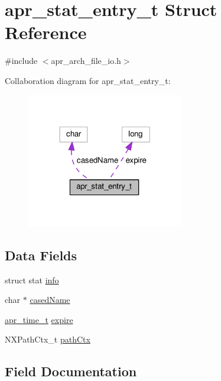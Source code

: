 \hypertarget{structapr__stat__entry__t}{}\section{apr\+\_\+stat\+\_\+entry\+\_\+t Struct Reference}
\label{structapr__stat__entry__t}


{\ttfamily \#include $<$apr\+\_\+arch\+\_\+file\+\_\+io.\+h$>$}



Collaboration diagram for apr\+\_\+stat\+\_\+entry\+\_\+t\+:
\nopagebreak
\begin{figure}[H]
\begin{center}
\leavevmode
\includegraphics[width=194pt]{structapr__stat__entry__t__coll__graph}
\end{center}
\end{figure}
\subsection*{Data Fields}
\begin{DoxyCompactItemize}
\item 
struct stat \hyperlink{structapr__stat__entry__t_aee1501fc3891a4e65d4c8b6130bb928a}{info}
\item 
char $\ast$ \hyperlink{structapr__stat__entry__t_a7b317c0cbf1cda51d11bd7d75cc3f7d9}{cased\+Name}
\item 
\hyperlink{group__apr__time_gadb4bde16055748190eae190c55aa02bb}{apr\+\_\+time\+\_\+t} \hyperlink{structapr__stat__entry__t_a8d69f4898156e3ff0e79b61ea7370277}{expire}
\item 
N\+X\+Path\+Ctx\+\_\+t \hyperlink{structapr__stat__entry__t_aa494f612975d922420ef7a7eead13e57}{path\+Ctx}
\end{DoxyCompactItemize}


\subsection{Field Documentation}
